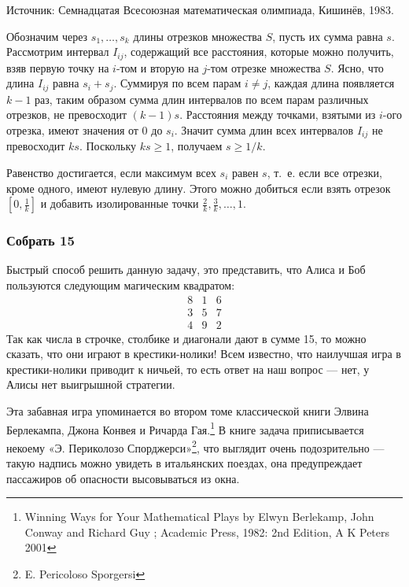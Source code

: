{\small Источник: Семнадцатая Всесоюзная математическая олимпиада, Кишинёв, 1983.}

Обозначим через $s_1,\dots,s_k$ длины отрезков множества $S$,
пусть их сумма равна $s$.
Рассмотрим интервал $I_{ij}$, содержащий все расстояния, которые можно получить, взяв первую точку на $i$-том и вторую на $j$-том отрезке множества $S$.
Ясно, что длина $I_{ij}$ равна $s_i+s_j$.
Суммируя по всем парам $i\ne j$, 
каждая длина появляется $k-1$ раз,
таким образом сумма длин интервалов по всем парам различных отрезков, не превосходит $(k-1) s$.
Расстояния между точками, взятыми из $i$-ого отрезка, имеют значения от $0$ до $s_i$.
Значит сумма длин всех интервалов $I_{ij}$ не превосходит $k s$.
Поскольку $k s\ge 1$, получаем $s\ge 1/k$.
\heart

Равенство достигается, если максимум всех $s_i$ равен $s$, 
т.~е. если все отрезки, кроме одного, имеют нулевую длину.
Этого можно добиться если взять отрезок $[0,\tfrac1k]$ и добавить изолированные точки
$\tfrac2k,\tfrac3k,\dots,1$.


\subsubsection*{Собрать 15} %

Быстрый способ решить данную задачу, это представить, что Алиса и Боб пользуются следующим магическим квадратом:
$$
\begin{matrix}
8&1&6\\
3&5&7\\
4&9&2
\end{matrix}
$$
Так как числа в строчке, столбике и диагонали дают в сумме 15, то можно сказать, что они играют в крестики-нолики! 
Всем известно, что наилучшая игра в крестики-нолики приводит к ничьей,
то есть ответ на наш вопрос --- нет, у Алисы нет выигрышной стратегии.
\heart

Эта забавная игра упоминается во втором томе классической книги Элвина Берлекампа, Джона Конвея и Ричарда Гая.\footnote{Winning Ways for Your Mathematical Plays by Elwyn Berlekamp, John Conway and Richard Guy ; Academic Press, 1982: 2nd Edition, A K Peters 2001}
В книге задача приписывается некоему «Э. Периколозо Спорджерси»\footnote{E. Pericoloso Sporgersi}, что выглядит очень подозрительно --- такую надпись можно увидеть в итальянских поездах, она предупреждает пассажиров об опасности высовываться из окна.
